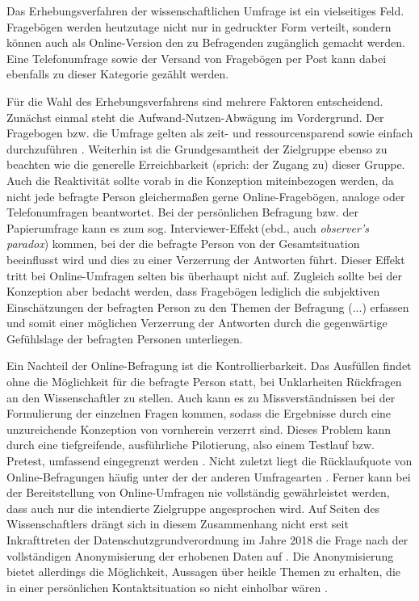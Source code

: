 Das Erhebungsverfahren der wissenschaftlichen Umfrage ist ein vielseitiges Feld. Fragebögen werden heutzutage nicht nur in gedruckter Form verteilt, sondern können auch als Online-Version den zu Befragenden zugänglich gemacht werden. Eine Telefonumfrage sowie der Versand von Fragebögen per Post kann dabei ebenfalls zu dieser Kategorie gezählt werden.

Für die Wahl des Erhebungsverfahrens sind mehrere Faktoren entscheidend. Zunächst einmal steht die Aufwand-Nutzen-Abwägung im Vordergrund. Der Fragebogen bzw. die Umfrage gelten als zeit- und ressourcensparend sowie einfach durchzuführen \citep[59]{albert_empirisches_2014}. Weiterhin ist die Grundgesamtheit der Zielgruppe ebenso zu beachten wie die generelle Erreichbarkeit (sprich: der Zugang zu) dieser Gruppe. Auch die Reaktivität sollte vorab in die Konzeption miteinbezogen werden, da nicht jede befragte Person gleichermaßen gerne Online-Fragebögen, analoge oder Telefonumfragen beantwortet. Bei der persönlichen Befragung bzw. der Papierumfrage kann es zum sog. \glqq Interviewer-Effekt\grqq\,(ebd., auch \emph{observer's paradox}) kommen, bei der die befragte Person von der Gesamtsituation beeinflusst wird und dies zu einer Verzerrung der Antworten führt. Dieser Effekt tritt bei Online-Umfragen selten bis überhaupt nicht auf. Zugleich sollte bei der Konzeption aber bedacht werden, dass Fragebögen lediglich \glqq die subjektiven Einschätzungen der befragten Person zu den Themen der Befragung (...) erfassen\grqq{} \citep[164]{aeppli_empirisches_2016} und somit einer möglichen Verzerrung der Antworten durch die gegenwärtige Gefühlslage der befragten Personen unterliegen.

\begin{sloppypar}
Ein Nachteil der Online-Befragung ist die Kontrollierbarkeit. Das Ausfüllen findet ohne die Möglichkeit für die befragte Person statt, bei Unklarheiten Rückfragen an den Wissenschaftler zu stellen. Auch kann es zu Missverständnissen bei der Formulierung der einzelnen Fragen kommen, sodass die Ergebnisse durch eine unzureichende Konzeption von vornherein verzerrt sind. Dieses Problem kann durch eine tiefgreifende, ausführliche Pilotierung, also einem Testlauf bzw. Pretest, umfassend eingegrenzt werden \citep[61]{aeppli_empirisches_2016}. Nicht zuletzt liegt die Rücklaufquote von Online-Befragungen häufig unter der der anderen Umfragearten \citep[165]{aeppli_empirisches_2016}. Ferner kann bei der Bereitstellung von Online-Umfragen nie vollständig gewährleistet werden, dass auch nur die intendierte Zielgruppe angesprochen wird. Auf Seiten des Wissenschaftlers drängt sich in diesem Zusammenhang nicht erst seit Inkrafttreten der Datenschutzgrundverordnung im Jahre 2018 die Frage nach der vollständigen Anonymisierung der erhobenen Daten auf \citep[16]{kirchhoff_fragebogen_2010}. Die Anonymisierung bietet allerdings die Möglichkeit, Aussagen über heikle Themen zu erhalten, die in einer persönlichen Kontaktsituation so nicht einholbar wären \citep[165]{aeppli_empirisches_2016}.
\end{sloppypar}

